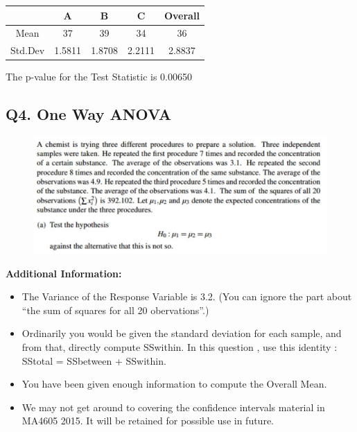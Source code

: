 \documentclass[a4paper,12pt]{article}
\begin{document}
{
	\Large
	\begin{center}
		\begin{tabular}{|c|c|c|c||c|} 
			\hline  & A & B & C & Overall \\ 
			\hline Mean & 37 & 39& 34 &36 \\ 
			\hline Std.Dev &  1.5811 & 1.8708 & 2.2111 & 2.8837 \\
			
			\hline 
		\end{tabular}
	\end{center}
}
The p-value for the Test Statistic is 0.00650

\newpage
\subsection*{Q4. One Way ANOVA }
\begin{figure}[h!]
	\centering
	\includegraphics[width=1\linewidth]{image/Q24review1}
	
\end{figure}

\noindent \textbf{Additional Information: }
\begin{itemize}
	\item The Variance of the Response Variable is 3.2. (You can ignore the part about “the sum of squares for all 20 obervations”.)
	\item  Ordinarily you would be given the standard deviation for each sample, and from that, directly compute SSwithin. In this question , use this identity : SStotal = SSbetween + SSwithin.
	\item  You have been given enough information to compute the Overall Mean.
	\item  We may not get around to covering the confidence intervals material in MA4605 2015. It will be retained for possible use in future.
\end{itemize}
\newpage
\end{document}
